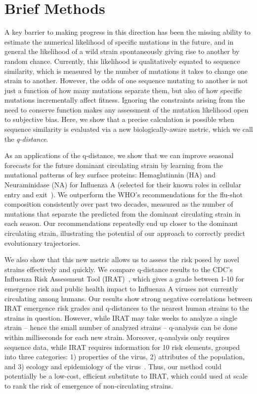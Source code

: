 \documentclass[onecolumn, compsoc,10pt]{IEEEtran}
\begin{document}
\section*{Brief Methods}

A key barrier to making progress in this direction has been the missing ability to estimate the numerical likelihood of specific mutations in the future, and in general  the likelihood of a wild strain spontaneously giving rise to another by random chance. Currently, this likelihood is qualitatively equated to sequence similarity, which is measured by the number of mutations it takes to change one strain to another. However, the odds of one sequence mutating to another is not just a function of how many mutations separate them, but also of how specific mutations incrementally affect fitness. Ignoring the constraints arising from the need to conserve function makes any assessment of the mutation likelihood open to subjective bias. Here, we show that a precise calculation is possible when sequence similarity is evaluated via a new biologically-aware metric, which we call the \textit{q-distance}.

As an applications of the q-distance, we show that we can improve seasonal forecasts for the future dominant circulating strain by learning from the mutational patterns of key surface proteins: Hemaglutinnin (HA) and Neuraminidase (NA) for Influenza A (selected for their known roles in cellular entry and exit~\cite{gamblin2010influenza}). We outperform the WHO's recommendations for the flu-shot composition consistently over past two decades, measured as the number of mutations that separate the predicted from the dominant circulating strain in each season. Our recommendations repeatedly end up closer to the dominant circulating strain, illustrating the potential of our approach to correctly predict evolutionary trajectories. 

We also show that this new metric allows us to  assess the risk posed by novel strains  effectively and quickly. We compare q-distance results to the CDC's Influenza Risk Assessment Tool (IRAT)~\cite{Influenz24:online}, which gives a grade between 1-10 for emergence risk and public health impact to Influenza A viruses not currently circulating among humans. Our results show strong negative correlations between IRAT emergence risk grades and q-distances to the nearest human strains to the strains in question. However, while IRAT may take weeks to analyze a single strain -- hence the small number of analyzed strains -- q-analysis can be done within milliseconds for each new strain. Moreover, q-analysis only requires sequence data, while IRAT requires information for 10 risk elements, grouped into three categories: 1) properties of the virus, 2) attributes of the population, and 3) ecology and epidemiology of the virus~\cite{Influenz24:online}. Thus, our method could potentially be a low-cost, efficient substitute to IRAT, which could used at scale to rank the risk of emergence of non-circulating strains.
\end{document}

